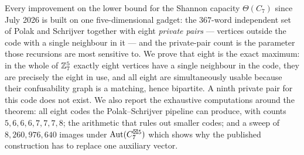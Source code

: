 Every improvement on the lower bound for the Shannon capacity $\Theta(C_7)$ since July 2026
is built on one five-dimensional gadget: the $367$-word independent set of Polak and
Schrijver together with eight \emph{private pairs} --- vertices outside the code with a
single neighbour in it --- and the private-pair count is the parameter those recursions are
most sensitive to. We prove that eight is the exact maximum: in the whole of $\mathbb{Z}_7^5$ exactly
eight vertices have a single neighbour in the code, they are precisely the eight in use, and
all eight are simultaneously usable because their confusability graph is a matching, hence
bipartite. A ninth private pair for this code does not exist. We also report the exhaustive
computations around the theorem: all eight codes the Polak--Schrijver pipeline can produce,
with counts $5,6,6,6,7,7,7,8$; the arithmetic that rules out smaller codes; and a sweep of
$8{,}260{,}976{,}640$ images under $\mathrm{Aut}(C_7^{\boxtimes 5})$ which shows why the
published construction has to replace one auxiliary vector.
